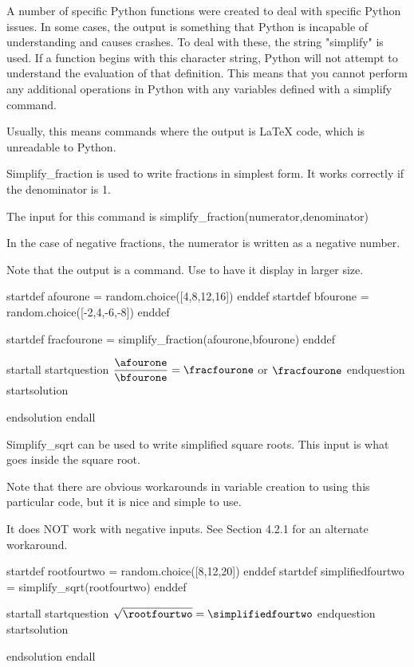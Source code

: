 

A number of specific Python functions were created to deal with specific Python issues. In some cases, the output is something that Python is incapable of understanding and causes crashes. To deal with these, the string "simplify" is used. If a function begins with this character string, Python will not attempt to understand the evaluation of that definition. This means that you cannot perform any additional operations in Python with any variables defined with a simplify command.

Usually, this means commands where the output is LaTeX code, which is unreadable to Python.




Simplify_fraction is used to write fractions in simplest form. It works correctly if the denominator is 1. 

The input for this command is simplify_fraction(numerator,denominator)

In the case of negative fractions, the numerator is written as a negative number. 

Note that the output is a \frac command. Use \displaystyle to have it display in larger size.

startdef afourone = random.choice([4,8,12,16]) enddef
startdef bfourone = random.choice([-2,4,-6,-8]) enddef

startdef fracfourone = simplify_fraction(afourone,bfourone) enddef

startall
startquestion $\dfrac{\afourone}{\bfourone} = \fracfourone$ or $\displaystyle \fracfourone$ 
endquestion
startsolution \item  endsolution
endall




Simplify_sqrt can be used to write simplified square roots. This input is what goes inside the square root.

Note that there are obvious workarounds in variable creation to using this particular code, but it is nice and simple to use.

It does NOT work with negative inputs. See Section 4.2.1 for an alternate workaround.

startdef rootfourtwo = random.choice([8,12,20]) enddef
startdef simplifiedfourtwo = simplify_sqrt(rootfourtwo) enddef

startall
startquestion  $\sqrt{\rootfourtwo} = \simplifiedfourtwo$ endquestion
startsolution \item  endsolution
endall


